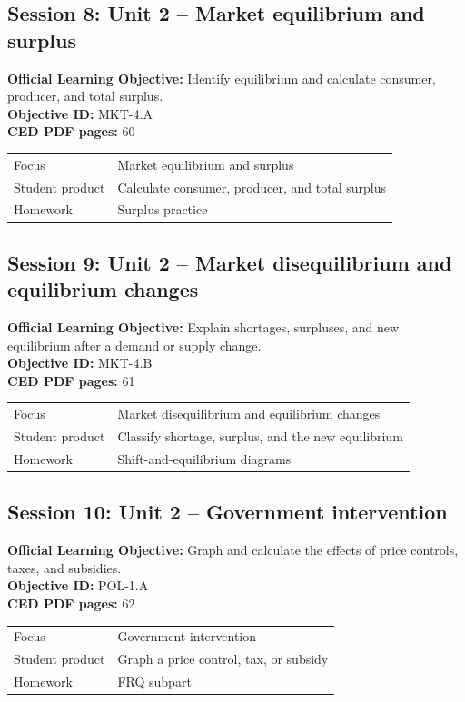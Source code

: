 \documentclass[11pt,a4paper]{article}
\newcommand{\objectivebox}[1]{\noindent\colorbox{aplight}{\parbox{0.96\textwidth}{#1}}}
\begin{document}
\subsection{Session 8: Unit 2 -- Market equilibrium and surplus}
\objectivebox{\textbf{Official Learning Objective:} Identify equilibrium and calculate consumer, producer, and total surplus.\\\textbf{Objective ID:} MKT-4.A\\\textbf{CED PDF pages:} 60}\par\vspace{0.4em}
\begin{tabularx}{\textwidth}{p{3.0cm}Y}
\toprule
Focus & Market equilibrium and surplus\\
Student product & Calculate consumer, producer, and total surplus\\
Homework & Surplus practice\\
\bottomrule
\end{tabularx}
\subsection{Session 9: Unit 2 -- Market disequilibrium and equilibrium changes}
\objectivebox{\textbf{Official Learning Objective:} Explain shortages, surpluses, and new equilibrium after a demand or supply change.\\\textbf{Objective ID:} MKT-4.B\\\textbf{CED PDF pages:} 61}\par\vspace{0.4em}
\begin{tabularx}{\textwidth}{p{3.0cm}Y}
\toprule
Focus & Market disequilibrium and equilibrium changes\\
Student product & Classify shortage, surplus, and the new equilibrium\\
Homework & Shift-and-equilibrium diagrams\\
\bottomrule
\end{tabularx}
\subsection{Session 10: Unit 2 -- Government intervention}
\objectivebox{\textbf{Official Learning Objective:} Graph and calculate the effects of price controls, taxes, and subsidies.\\\textbf{Objective ID:} POL-1.A\\\textbf{CED PDF pages:} 62}\par\vspace{0.4em}
\begin{tabularx}{\textwidth}{p{3.0cm}Y}
\toprule
Focus & Government intervention\\
Student product & Graph a price control, tax, or subsidy\\
Homework & FRQ subpart\\
\bottomrule
\end{tabularx}
\end{document}
